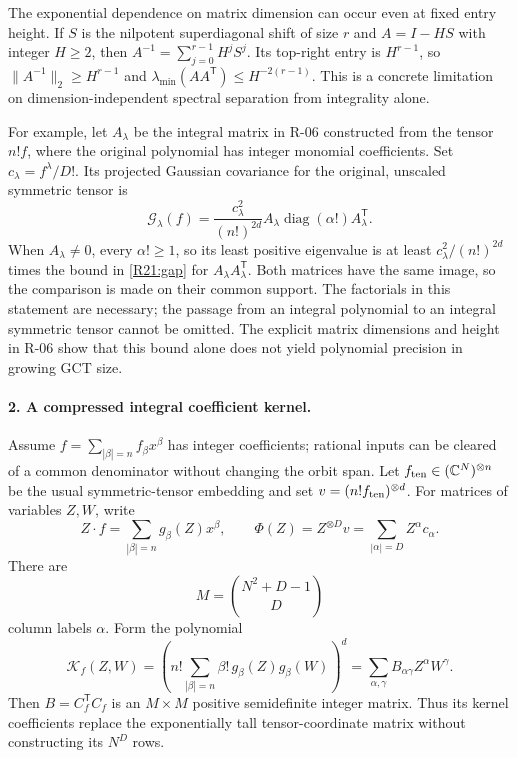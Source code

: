 The exponential dependence on matrix dimension can occur even at fixed
entry height. If $S$ is the nilpotent superdiagonal shift of size $r$
and $A=I-HS$ with integer $H\geq2$, then
$A^{-1}=\sum_{j=0}^{r-1}H^jS^j$. Its top-right entry is $H^{r-1}$,
so $\|A^{-1}\|_2\geq H^{r-1}$ and
$\lambda_{\min}(AA^{\mathsf T})\leq H^{-2(r-1)}$.
This is a concrete limitation on dimension-independent spectral
separation from integrality alone.

For example, let $A_\lambda$ be the integral matrix in R-06 constructed
from the tensor $n!f$, where the original polynomial has integer monomial
coefficients. Set $c_\lambda=f^\lambda/D!$. Its projected Gaussian
covariance for the original, unscaled symmetric tensor is
\begin{equation}\label{R21:gaussiantransport}
 \mathcal G_\lambda(f)=
 \frac{c_\lambda^2}{(n!)^{2d}}
 A_\lambda\operatorname{diag}(\alpha!)A_\lambda^{\mathsf T}.
\end{equation}
When $A_\lambda\ne0$, every $\alpha!\geq1$, so its least positive eigenvalue is at least
$c_\lambda^2/(n!)^{2d}$ times the bound in \eqref{R21:gap} for
$A_\lambda A_\lambda^{\mathsf T}$. Both matrices have the same image,
so the comparison is made on their common support. The factorials in
this statement are necessary; the passage from an integral polynomial
to an integral symmetric tensor cannot be omitted.
The explicit matrix dimensions and height in R-06 show that this
bound alone does not yield polynomial precision in growing GCT size.

\paragraph{2. A compressed integral coefficient kernel.}
Assume $f=\sum_{|\beta|=n}f_\beta x^\beta$ has integer coefficients;
rational inputs can be cleared of a common denominator without changing
the orbit span. Let $f_{\rm ten}\in(\mathbb C^N)^{\otimes n}$ be the
usual symmetric-tensor embedding and set
$v=(n!f_{\rm ten})^{\otimes d}$.
For matrices of variables $Z,W$, write
\[
 Z\cdot f=\sum_{|\beta|=n}g_\beta(Z)x^\beta,
 \qquad
 \Phi(Z)=Z^{\otimes D}v=\sum_{|\alpha|=D}Z^\alpha c_\alpha.
\]
There are
\[
 M=\binom{N^2+D-1}{D}
\]
column labels $\alpha$. Form the polynomial
\begin{equation}\label{R21:kernel}
 \mathcal K_f(Z,W)=
 \left(n!\sum_{|\beta|=n}\beta!\,
                     g_\beta(Z)g_\beta(W)\right)^d
       =\sum_{\alpha,\gamma}B_{\alpha\gamma}Z^\alpha W^\gamma.
\end{equation}
Then $B=C_f^{\mathsf T}C_f$ is an $M\times M$ positive semidefinite
integer matrix. Thus its kernel coefficients replace the exponentially
tall tensor-coordinate matrix without constructing its $N^D$ rows.

